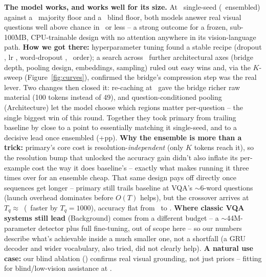 \documentclass[final]{article}
\begin{document}
\textbf{The model works, and works well for its size.} At \primaryTestAcc\ single-seed
(\ensembleTestAcc\ ensembled) against a \majorityFloor\ majority floor and a \blindFloor\ blind
floor, both models answer real visual questions well above chance in \primaryTotalSize\ or less --
a strong outcome for a frozen, sub-100MB, CPU-trainable design with no attention anywhere in its
vision-language path. \textbf{How we got there:} hyperparameter tuning found a stable recipe
(dropout \primaryTunedDropout, lr \primaryTunedLR, word-dropout \primaryTunedWordDropout,
\primaryTunedTokenOrder\ order); a search across \phaseOneAxesTried\ further architectural axes
(bridge depth, pooling design, embeddings, sampling) ruled out easy wins and, via the $K$-sweep
(Figure~\ref{fig:curves}), confirmed the bridge's compression step was the real lever. Two changes then closed it: re-caching at \primaryResolution\
gave the bridge richer raw material (100 tokens instead of 49), and question-conditioned pooling
(Architecture) let the model choose which regions matter per-question -- the single biggest win of
this round. Together they took primary from trailing baseline by close to a point to essentially
matching it single-seed, and to a decisive lead once ensembled (+\ensembleGainOverBaseline pp).
\textbf{Why the ensemble is more than a trick:} primary's core cost is
resolution-\emph{independent} (only $K$ tokens reach it), so the resolution bump that unlocked the
accuracy gain didn't also inflate its per-example cost the way it does baseline's -- exactly what
makes running it three times over for an ensemble cheap. That same design pays off directly once
sequences get longer -- primary still trails baseline at VQA's $\sim$6-word questions (launch
overhead dominates before $O(T)$ helps), but the crossover arrives at $T_q{\approx}$\crossoverTq\
(\crossoverSpeedup\ faster by $T_q{=}1000$), accuracy flat from \longctxOneXAcc\ to
\longctxSixteenXAcc. \textbf{Where classic VQA systems still lead} (Background) comes from a
different budget -- a $\sim$44M-parameter detector plus full fine-tuning, out of scope here -- so
our numbers describe what's achievable inside a much smaller one, not a shortfall (a GRU decoder
and wider vocabulary, also tried, did not clearly help). \textbf{A natural use case:} our blind
ablation (\blindFloor) confirms real visual grounding, not just priors
\citep{agrawal2018dontassume} -- fitting for blind/low-vision assistance at \primaryTotalSize.

\newpage

\end{document}
